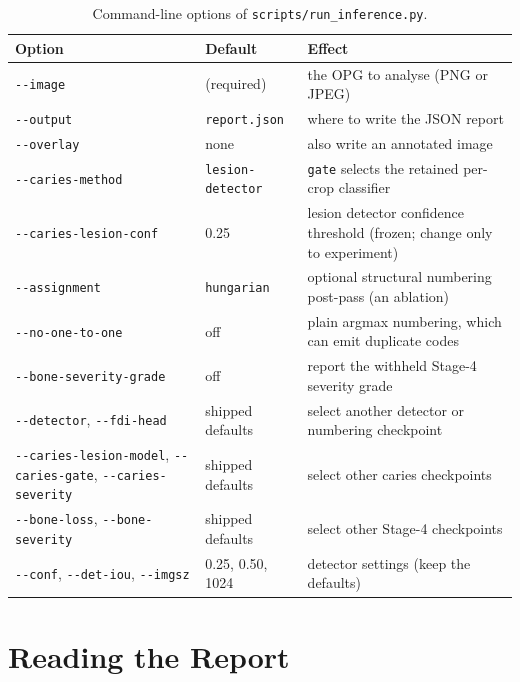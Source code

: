 \begin{table}[!htbp]
\centering
\caption[Command-line options]{Command-line options of \texttt{scripts/run\_inference.py}.}
\label{tab:cli}
\small
\begin{tabularx}{\textwidth}{@{}L{4.6cm}L{3.2cm}Y@{}}
\toprule
Option & Default & Effect\\
\midrule
\texttt{-{}-image} & (required) & the OPG to analyse (PNG or JPEG)\\
\texttt{-{}-output} & \texttt{report.json} & where to write the JSON report\\
\texttt{-{}-overlay} & none & also write an annotated image\\
\texttt{-{}-caries-method} & \texttt{lesion-detector} & \texttt{gate} selects the retained per-crop classifier\\
\texttt{-{}-caries-lesion-conf} & 0.25 & lesion detector confidence threshold (frozen; change only to experiment)\\
\texttt{-{}-assignment} & \texttt{hungarian} & optional structural numbering post-pass (an ablation)\\
\texttt{-{}-no-one-to-one} & off & plain argmax numbering, which can emit duplicate codes\\
\texttt{-{}-bone-severity-grade} & off & report the withheld Stage-4 severity grade\\
\texttt{-{}-detector}, \texttt{-{}-fdi-head} & shipped defaults & select another detector or numbering checkpoint\\
\texttt{-{}-caries-lesion-model}, \texttt{-{}-caries-gate}, \texttt{-{}-caries-severity} & shipped defaults & select other caries checkpoints\\
\texttt{-{}-bone-loss}, \texttt{-{}-bone-severity} & shipped defaults & select other Stage-4 checkpoints\\
\texttt{-{}-conf}, \texttt{-{}-det-iou}, \texttt{-{}-imgsz} & 0.25, 0.50, 1024 & detector settings (keep the defaults)\\
\bottomrule
\end{tabularx}
\end{table}

\section{Reading the Report}

